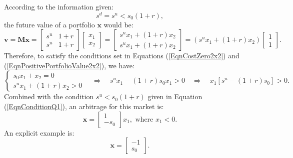 \documentclass[final,3p,times]{elsarticle}
\begin{document}
	According to the information given:
	\begin{equation}
		\label{EqnConditionQ1}
		s^d = s^u < s_0 \left(1+r\right)
		,
	\end{equation}
	the future value of a portfolio $\mathbf{x}$ would be:
	\begin{equation}
		\mathbf{v}=\mathbf{Mx}=
			\begin{bmatrix} s^u & 1+r \\ s^u & 1+r \end{bmatrix}
			\begin{bmatrix} x_1 \\ x_2 \end{bmatrix}
			=
			\begin{bmatrix} s^u x_1 + \left(1+r\right) x_2 \\ s^u x_1 + \left(1+r\right) x_2 \end{bmatrix}
			=
			\left( s^u x_1 + \left(1+r\right) x_2 \right) \begin{bmatrix} 1 \\ 1 \end{bmatrix}
			.
	\end{equation}
	Therefore, to satisfy the conditions set in Equations (\ref{EqnCostZero2x2}) and (\ref{EqnPositivePortfolioValue2x2}), we have:
	\begin{equation}
		\begin{cases}
			s_0 x_1 + x_2 = 0 \\
			s^u x_1 + \left(1+r\right) x_2 > 0
		\end{cases}
		\quad \Rightarrow \quad
		s^u x_1 - \left(1+r\right) s_0 x_1 > 0
		\quad \Rightarrow \quad
		x_1 \left[ s^u - \left(1+r\right) s_0 \right] > 0
		.
	\end{equation}
	Combined with the condition $s^u < s_0 \left(1+r\right)$ given in Equation (\ref{EqnConditionQ1}), an arbitrage for this market is:
	\begin{equation}
		\mathbf{x}=
			\begin{bmatrix} 1 \\ -s_0 \end{bmatrix} x_1, \text{ where } x_1<0
		.
	\end{equation}
	An explicit example is:
	\begin{equation}
		\mathbf{x}=
		\begin{bmatrix} -1 \\ s_0 \end{bmatrix}
		.
	\end{equation}
	
\end{document}
